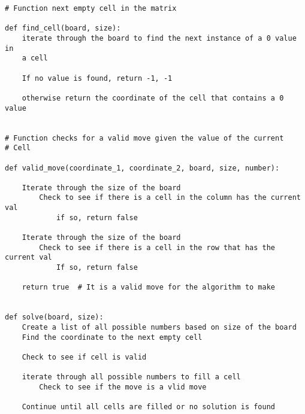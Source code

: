 \documentclass{article}
\begin{document}
\pagebreak


\begin{lstlisting}[frame=single]
# Function next empty cell in the matrix

def find_cell(board, size):
	iterate through the board to find the next instance of a 0 value in
	a cell

	If no value is found, return -1, -1

	otherwise return the coordinate of the cell that contains a 0 value	


# Function checks for a valid move given the value of the current
# Cell

def valid_move(coordinate_1, coordinate_2, board, size, number):

	Iterate through the size of the board
		Check to see if there is a cell in the column has the current val
			if so, return false

	Iterate through the size of the board
		Check to see if there is a cell in the row that has the current val
			If so, return false

	return true  # It is a valid move for the algorithm to make


def solve(board, size):
	Create a list of all possible numbers based on size of the board
	Find the coordinate to the next empty cell
	
	Check to see if cell is valid

	iterate through all possible numbers to fill a cell
		Check to see if the move is a vlid move
	
	Continue until all cells are filled or no solution is found
\end{lstlisting}






\end{document}
